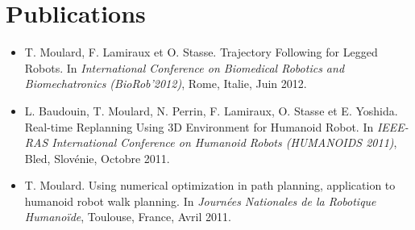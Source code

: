 \chapter*{Publications}
\label{chap:publis}

\begin{itemize}
\item T. Moulard, F. Lamiraux et O. Stasse. Trajectory Following for
  Legged Robots. In \emph{International Conference on Biomedical
    Robotics and Biomechatronics (BioRob'2012)}, Rome, Italie, Juin
  2012.
\item L. Baudouin, T. Moulard, N. Perrin, F. Lamiraux, O. Stasse et
  E. Yoshida. Real-time Replanning Using 3D Environment for Humanoid
  Robot. In \emph{IEEE-RAS International Conference on Humanoid Robots
    (HUMANOIDS 2011)}, Bled, Slovénie, Octobre 2011.
\item T. Moulard. Using numerical optimization in path planning,
  application to humanoid robot walk planning. In \emph{Journées
    Nationales de la Robotique Humanoïde}, Toulouse, France, Avril
  2011.
\end{itemize}
